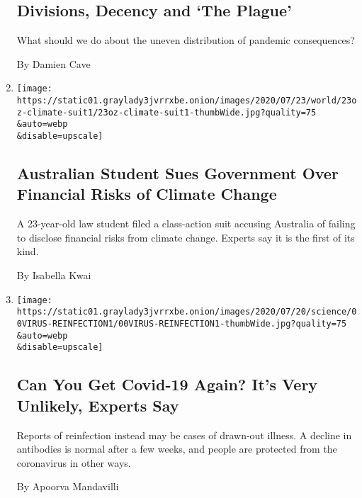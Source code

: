 \begin{enumerate}
  \hypertarget{divisions-decency-and-the-plague}{%
  \subsection{Divisions, Decency and `The
  Plague'}\label{divisions-decency-and-the-plague}}

  What should we do about the uneven distribution of pandemic
  consequences?

  By Damien Cave
\item
  \href{/2020/07/23/world/australia/lawsuit-climate-change-bonds.html}{}

  \texttt{[image: https://static01.graylady3jvrrxbe.onion/images/2020/07/23/world/23oz-climate-suit1/23oz-climate-suit1-thumbWide.jpg?quality=75\\\&auto=webp\\\&disable=upscale]}

  \hypertarget{australian-student-sues-government-over-financial-risks-of-climate-change}{%
  \subsection{Australian Student Sues Government Over Financial Risks of
  Climate
  Change}\label{australian-student-sues-government-over-financial-risks-of-climate-change}}

  A 23-year-old law student filed a class-action suit accusing Australia
  of failing to disclose financial risks from climate change. Experts
  say it is the first of its kind.

  By Isabella Kwai
\item
  \href{/2020/07/22/health/covid-antibodies-herd-immunity.html}{}

  \texttt{[image: https://static01.graylady3jvrrxbe.onion/images/2020/07/20/science/00VIRUS-REINFECTION1/00VIRUS-REINFECTION1-thumbWide.jpg?quality=75\\\&auto=webp\\\&disable=upscale]}

  \hypertarget{can-you-get-covid-19-again-its-very-unlikely-experts-say}{%
  \subsection{Can You Get Covid-19 Again? It's Very Unlikely, Experts
  Say}\label{can-you-get-covid-19-again-its-very-unlikely-experts-say}}

  Reports of reinfection instead may be cases of drawn-out illness. A
  decline in antibodies is normal after a few weeks, and people are
  protected from the coronavirus in other ways.

  By Apoorva Mandavilli


\end{enumerate}
